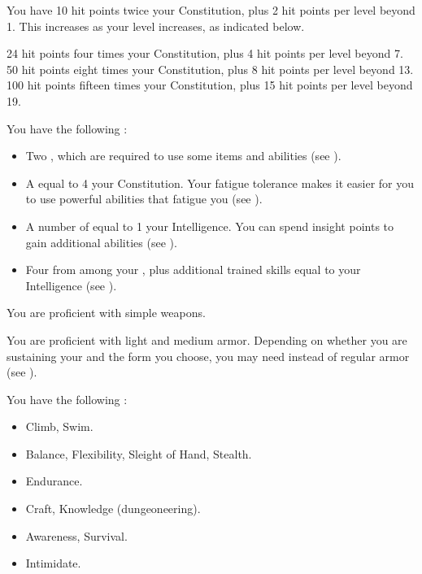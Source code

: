             You have 10 hit points \add twice your Constitution, plus 2 hit points per level beyond 1.
            This increases as your level increases, as indicated below.
            \begin{itemize}
                 24 hit points \add four times your Constitution, plus 4 hit points per level beyond 7.
                 50 hit points \add eight times your Constitution, plus 8 hit points per level beyond 13.
                 100 hit points \add fifteen times your Constitution, plus 15 hit points per level beyond 19.
            \end{itemize}

         You have the following :
        \begin{itemize}
            \item Two , which are required to use some items and abilities (see ).
            \item A  equal to 4 \add your Constitution.
                Your fatigue tolerance makes it easier for you to use powerful abilities that fatigue you (see ).
            \item A number of  equal to 1 \add your Intelligence.
                You can spend insight points to gain additional abilities (see ).
            \item Four  from among your , plus additional trained skills equal to your Intelligence (see ).
        \end{itemize}

        You are proficient with simple weapons.

        You are proficient with light and medium armor.
        Depending on whether you are sustaining your  and the form you choose, you may need  instead of regular armor (see ).

        You have the following :
        \begin{itemize}
            \item {} Climb, Swim.
            \item {} Balance, Flexibility, Sleight of Hand, Stealth.
            \item {} Endurance.
            \item {} Craft, Knowledge (dungeoneering).
            \item {} Awareness, Survival.
            \item {} Intimidate.
        \end{itemize}

